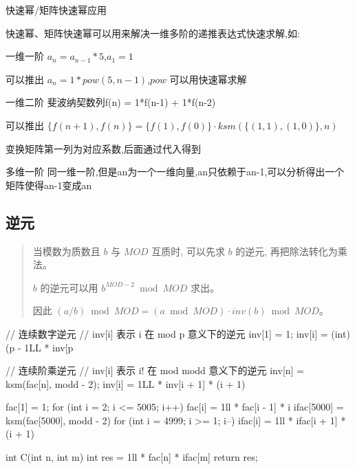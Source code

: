 \documentclass[UTF8,a4paper,11pt]{ctexart}
\newcommand{\topic}[1]{%
  \par\needspace{3\baselineskip}\vspace{0.45em}%
  \noindent{\bfseries\color{Primary}#1}\par\vspace{0.12em}%
}
\begin{document}
快速幂/矩阵快速幂应用

\topic{递推式加速}

快速幂、矩阵快速幂可以用来解决一维多阶的递推表达式快速求解,如:

一维一阶 $a_n = a_{n-1} * 5$,$a_1 = 1$

可以推出 $a_n = 1 * pow(5,n-1)$,$pow$ 可以用快速幂求解

一维二阶 斐波纳契数列f(n) = 1*f(n-1) + 1*f(n-2)

\begin{CodeBlock}
可以推出 $\{f(n+1),f(n)\} = \{f(1),f(0)\} \cdot ksm(\{(1,1),(1,0)\},n)$
\end{CodeBlock}

变换矩阵第一列为对应系数,后面通过代入得到

多维一阶 同一维一阶,但是an为一个一维向量,an只依赖于an-1,可以分析得出一个矩阵使得an-1变成an

\subsection{逆元}

\topic{除法取模}

\begin{quote}
当模数为质数且 $b$ 与 $MOD$ 互质时, 可以先求 $b$ 的逆元, 再把除法转化为乘法。\par
$b$ 的逆元可以用 $b^{MOD-2} \bmod MOD$ 求出。\par
因此 $(a / b) \bmod MOD = (a \bmod MOD) \cdot inv(b) \bmod MOD$。\par
\end{quote}

\topic{连续逆元}

\begin{CodeBlock}
// 连续数字逆元
// inv[i] 表示 i 在 mod p 意义下的逆元
inv[1] = 1;
inv[i] = (int)(p - 1LL * inv[p %

// 连续阶乘逆元
// inv[i] 表示 i! 在 mod modd 意义下的逆元
inv[n] = ksm(fac[n], modd - 2);
inv[i] = 1LL * inv[i + 1] * (i + 1) %
\end{CodeBlock}

\begin{CodeBlock}
fac[1] = 1;
for (int i = 2; i <= 5005; i++)
    fac[i] = 1ll * fac[i - 1] * i %
ifac[5000] = ksm(fac[5000], modd - 2) %
for (int i = 4999; i >= 1; i--)
    ifac[i] = 1ll * ifac[i + 1] * (i + 1) %
\end{CodeBlock}

\begin{CodeBlock}
int C(int n, int m) {
    int res = 1ll * fac[n] * ifac[m] %
    return res;
}
\end{CodeBlock}
\end{document}
